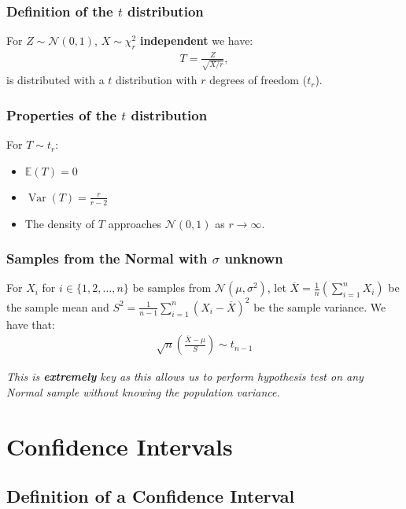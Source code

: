 \documentclass[a4paper, 12pt, twoside]{article}
\DeclareMathOperator{\Var}{Var}
\begin{document}
\subsubsection{Definition of the $t$ distribution}

For $Z \sim \mathcal{N}(0, 1)$, $X \sim \chi^2_r$ \textbf{independent} we have:
\begin{align*}
    T = \frac{Z}{\sqrt{X / r}},
\end{align*}
is distributed with a $t$ distribution with $r$ degrees of freedom ($t_r$).

\subsubsection{Properties of the $t$ distribution}

For $T \sim t_r$:

\begin{itemize}
    \item $\mathbb{E}(T) = 0$
    \item $\Var(T) = \frac{r}{r - 2}$
    \item The density of $T$ approaches $\mathcal{N}(0, 1)$ as $r\to\infty$.
\end{itemize}

\subsubsection{Samples from the Normal with $\sigma$ unknown}

For $X_i$ for $i \in \{1, 2, \ldots, n\}$ be samples from 
$\mathcal{N}(\mu, \sigma^2)$, let $\overline{X} = \frac{1}{n}
(\sum_{i = 1}^n X_i)$ be the sample mean and $S^2 = \frac{1}{n - 1}
\sum_{i = 1}^n(X_i - \overline{X})^2$ be the sample variance. We have that:
\begin{align*}
    \sqrt{n}\left(\frac{\overline{X} - \mu}{S}\right) \sim t_{n - 1}
\end{align*}

\textit{This is \textbf{extremely} key as this allows us to perform hypothesis
test on any Normal sample without knowing the population variance.}

\section{Confidence Intervals}

\subsection{Definition of a Confidence Interval}
\end{document}

